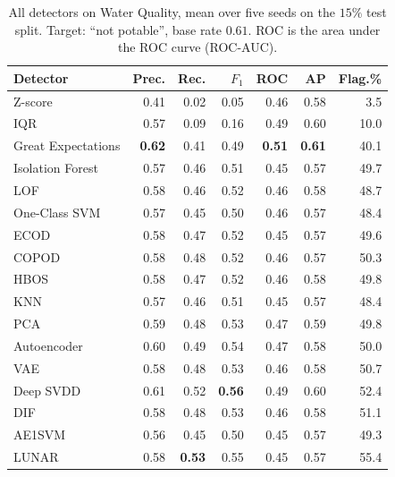 \documentclass[conference]{IEEEtran}
\begin{document}
\begin{table}[t]
\caption{All detectors on Water Quality, mean over five seeds on the
$15\%$ test split. Target: ``not potable'', base rate $0.61$. ROC is the area under the ROC curve (ROC-AUC).}
\label{tab:water}
\centering
\setlength{\tabcolsep}{4pt}
\footnotesize
\begin{tabular}{lrrrrrr}
\toprule
Detector & Prec. & Rec. & $F_1$ & ROC & AP & Flag.\% \\
\midrule
Z-score            & 0.41 & 0.02 & 0.05 & 0.46 & 0.58 & 3.5 \\
IQR                & 0.57 & 0.09 & 0.16 & 0.49 & 0.60 & 10.0 \\
Great Expectations & \textbf{0.62} & 0.41 & 0.49 & \textbf{0.51} & \textbf{0.61} & 40.1 \\
\midrule
Isolation Forest   & 0.57 & 0.46 & 0.51 & 0.45 & 0.57 & 49.7 \\
LOF                & 0.58 & 0.46 & 0.52 & 0.46 & 0.58 & 48.7 \\
One-Class SVM      & 0.57 & 0.45 & 0.50 & 0.46 & 0.57 & 48.4 \\
ECOD               & 0.58 & 0.47 & 0.52 & 0.45 & 0.57 & 49.6 \\
COPOD              & 0.58 & 0.48 & 0.52 & 0.46 & 0.57 & 50.3 \\
HBOS               & 0.58 & 0.47 & 0.52 & 0.46 & 0.58 & 49.8 \\
KNN                & 0.57 & 0.46 & 0.51 & 0.45 & 0.57 & 48.4 \\
PCA                & 0.59 & 0.48 & 0.53 & 0.47 & 0.59 & 49.8 \\
\midrule
Autoencoder        & 0.60 & 0.49 & 0.54 & 0.47 & 0.58 & 50.0 \\
VAE                & 0.58 & 0.48 & 0.53 & 0.46 & 0.58 & 50.7 \\
Deep SVDD          & 0.61 & 0.52 & \textbf{0.56} & 0.49 & 0.60 & 52.4 \\
DIF                & 0.58 & 0.48 & 0.53 & 0.46 & 0.58 & 51.1 \\
AE1SVM             & 0.56 & 0.45 & 0.50 & 0.45 & 0.57 & 49.3 \\
LUNAR              & 0.58 & \textbf{0.53} & 0.55 & 0.45 & 0.57 & 55.4 \\
\bottomrule
\end{tabular}
\end{table}
\end{document}
